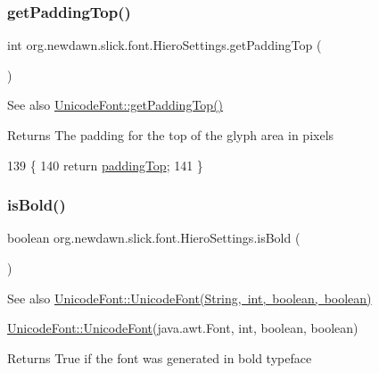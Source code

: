 \subsubsection{\texorpdfstring{get\+Padding\+Top()}{getPaddingTop()}}
{\footnotesize\ttfamily int org.\+newdawn.\+slick.\+font.\+Hiero\+Settings.\+get\+Padding\+Top (\begin{DoxyParamCaption}{ }\end{DoxyParamCaption})\hspace{0.3cm}{\ttfamily [inline]}}

\begin{DoxySeeAlso}{See also}
\mbox{\hyperlink{classorg_1_1newdawn_1_1slick_1_1_unicode_font_a77eb496db108ecac650dd6b17792cd7a}{Unicode\+Font\+::get\+Padding\+Top()}}
\end{DoxySeeAlso}
\begin{DoxyReturn}{Returns}
The padding for the top of the glyph area in pixels 
\end{DoxyReturn}

\begin{DoxyCode}
139                                 \{
140         \textcolor{keywordflow}{return} \mbox{\hyperlink{classorg_1_1newdawn_1_1slick_1_1font_1_1_hiero_settings_ad0793e48192b48898df4f3a31d4b3954}{paddingTop}};
141     \}
\end{DoxyCode}
\mbox{\label{classorg_1_1newdawn_1_1slick_1_1font_1_1_hiero_settings_a18cf72994210154aaa68b7afabe5cfb2}} 
\subsubsection{\texorpdfstring{is\+Bold()}{isBold()}}
{\footnotesize\ttfamily boolean org.\+newdawn.\+slick.\+font.\+Hiero\+Settings.\+is\+Bold (\begin{DoxyParamCaption}{ }\end{DoxyParamCaption})\hspace{0.3cm}{\ttfamily [inline]}}

\begin{DoxySeeAlso}{See also}
\mbox{\hyperlink{classorg_1_1newdawn_1_1slick_1_1_unicode_font_a45cb814b2f8c0ec1e8dbc92c4594b33f}{Unicode\+Font\+::\+Unicode\+Font(\+String, int, boolean, boolean)}} 

\mbox{\hyperlink{classorg_1_1newdawn_1_1slick_1_1_unicode_font_acb84ea3da65e6ac55ce2283bc71e41cf}{Unicode\+Font\+::\+Unicode\+Font}}(java.\+awt.\+Font, int, boolean, boolean)
\end{DoxySeeAlso}
\begin{DoxyReturn}{Returns}
True if the font was generated in bold typeface 
\end{DoxyReturn}

